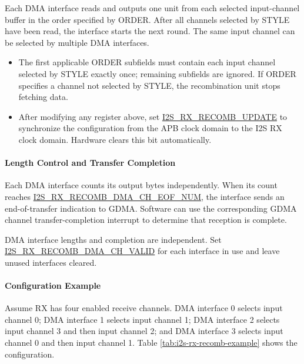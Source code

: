 \documentclass[main\_\_EN.tex]{subfiles}
\begin{document}
Each DMA interface reads and outputs one unit from each selected input-channel buffer in the order specified by ORDER. After all channels selected by STYLE have been read, the interface starts the next round. The same input channel can be selected by multiple DMA interfaces.

\begin{tiplisting}
\begin{itemize}
\vspace{-2em}
    \item The first applicable ORDER subfields must contain each input channel selected by STYLE exactly once; remaining subfields are ignored. If ORDER specifies a channel not selected by STYLE, the recombination unit stops fetching data.
    \item After modifying any register above, set \hyperref[fielddesc:I2SRXRECOMBUPDATE]{I2S\_RX\_RECOMB\_UPDATE} to synchronize the configuration from the APB clock domain to the I2S RX clock domain. Hardware clears this bit automatically.
\end{itemize}
\end{tiplisting}

\paragraph{Length Control and Transfer Completion}

Each DMA interface counts its output bytes independently. When its count reaches \hyperref[fielddesc:I2SRXRECOMBDMACH0EOFNUM]{I2S\_RX\_RECOMB\_DMA\_CH\_EOF\_NUM}, the interface sends an end-of-transfer indication to GDMA. Software can use the corresponding GDMA channel transfer-completion interrupt to determine that reception is complete.

DMA interface lengths and completion are independent. Set \hyperref[fielddesc:I2SRXRECOMBDMACH0VALID]{I2S\_RX\_RECOMB\_DMA\_CH\_VALID} for each interface in use and leave unused interfaces cleared.

\paragraph{Configuration Example}

Assume RX has four enabled receive channels. DMA interface 0 selects input channel 0; DMA interface 1 selects input channel 1; DMA interface 2 selects input channel 3 and then input channel 2; and DMA interface 3 selects input channel 0 and then input channel 1. Table \ref{tab:i2s-rx-recomb-example} shows the configuration.
\end{document}
